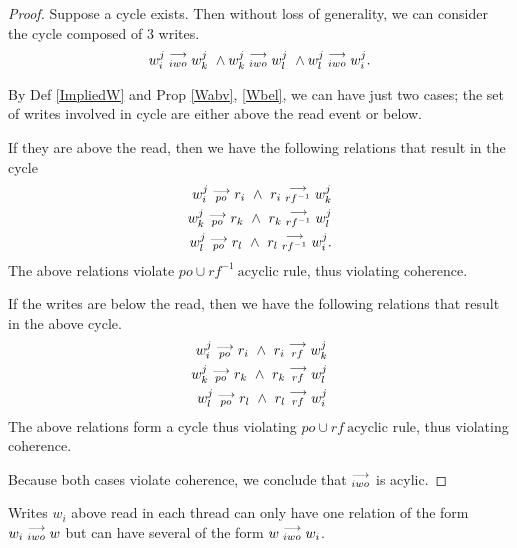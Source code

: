     \begin{proof}
        Suppose a cycle exists. Then without loss of generality, we can consider the cycle composed of 3 writes.
        \begin{align*}
            \reln{w_i^j}{iwo}{w_k^j} \ \wedge \reln{w_k^j}{iwo}{w_l^j} \ \wedge \reln{w_l^j}{iwo}{w_i^j}.  
        \end{align*}
        
        By Def \ref{ImpliedW} and Prop \ref{Wabv}, \ref{Wbel}, we can have just two cases; the set of writes involved in cycle are either above the read event or below.

        If they are above the read, then we have the following relations that result in the cycle
        \begin{align*}
            w_i^j\stackrel{\longrightarrow}{_{po}}r_i \ \wedge \ r_i\stackrel{\longrightarrow}{_{rf^{-1}}}w_k^j \\
            w_k^j\stackrel{\longrightarrow}{_{po}}r_k \ \wedge \ r_k\stackrel{\longrightarrow}{_{rf^{-1}}}w_l^j \\
            w_l^j\stackrel{\longrightarrow}{_{po}}r_l \ \wedge \ r_l\stackrel{\longrightarrow}{_{rf^{-1}}}w_i^j. 
        \end{align*}
        The above relations violate $po \cup rf^{-1} \ \text{acyclic}$ rule, thus violating coherence.
        
        If the writes are below the read, then we have the following relations that result in the above cycle.
        \begin{align*}
            w_i^j\stackrel{\longrightarrow}{_{po}}r_i \ \wedge \ r_i\stackrel{\longrightarrow}{_{rf}}w_k^j \\
            w_k^j\stackrel{\longrightarrow}{_{po}}r_k \ \wedge \ r_k\stackrel{\longrightarrow}{_{rf}}w_l^j \\
            w_l^j\stackrel{\longrightarrow}{_{po}}r_l \ \wedge \ r_l\stackrel{\longrightarrow}{_{rf}}w_i^j 
        \end{align*}
        The above relations form a cycle thus violating $po \cup rf \ \text{acyclic}$ rule, thus violating coherence.

        Because both cases violate coherence, we conclude that $\stackrel{\longrightarrow}{_{iwo}}$ is acylic. 
    \end{proof}


    \begin{property}
        \label{prop7}
        Writes $w_i$ above read in each thread can only have one relation of the form $w_i\stackrel{\longrightarrow}{_{iwo}}w$ but can have several of the form $w\stackrel{\longrightarrow}{_{iwo}}w_i$. 
    \end{property}

